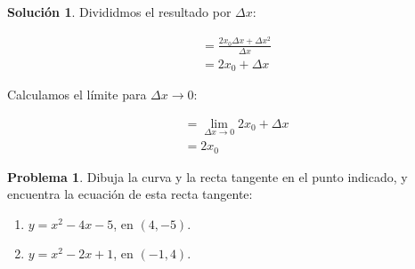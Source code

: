 \documentclass{article}
\theoremstyle{definition}
\newtheorem{problem}{Problema}
\newtheorem*{solution}{Solución}
\begin{document}
\begin{solution}
Divididmos el resultado por \( \Delta x \):

    \begin{align*}
    &= \frac{2x_0 \Delta x + \Delta x^2}{\Delta x} \\
    &= 2x_0 + \Delta x
    \end{align*}

Calculamos el límite para \( \Delta x \to 0 \):

    \begin{align*}
        &= \lim_{\Delta x \to 0} 2x_0 + \Delta x \\
        &= 2x_0
    \end{align*}
\end{solution}

\bigskip

\begin{problem}
Dibuja la curva y la recta tangente en el punto indicado, y encuentra la ecuación de esta recta tangente:
\begin{enumerate}
    \item \( y = x^2 - 4x - 5 \), en \((4,-5)\).
    \item \( y = x^2 - 2x + 1 \), en \((-1,4)\).
\end{enumerate}
\end{problem}
\end{document}
